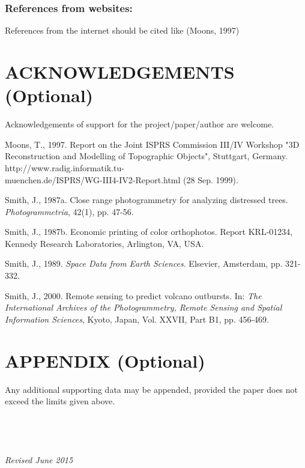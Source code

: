 \documentclass{isprs}
\begin{document}
\subsubsection{References from websites:}
References from the internet should be cited like (Moons, 1997)

\section*{ACKNOWLEDGEMENTS (Optional)}\label{ACKNOWLEDGEMENTS}

Acknowledgements of support for the project/paper/author are welcome. 

{%
	\begin{spacing}{0.9}%
	\end{spacing}
}
Moons, T., 1997. Report on the Joint ISPRS Commission III/IV Workshop 
"3D Reconstruction and Modelling of Topographic Objects", Stuttgart, Germany.
{http://www.radig.informatik.tu-}\\
{muenchen.de/ISPRS/WG-III4-IV2-Report.html} (28 Sep. 1999).

Smith, J., 1987a. Close range photogrammetry for analyzing distressed trees. 
\textit{Photogrammetria}, 42(1), pp. 47-56.

Smith, J., 1987b. Economic printing of color orthophotos. Report KRL-01234, Kennedy Research Laboratories, Arlington, VA, USA.

Smith, J., 1989. \textit{Space Data from Earth Sciences}. Elsevier, Amsterdam, pp. 321-332.

Smith, J., 2000. Remote sensing to predict volcano outbursts. 
In: \textit{The International Archives of the Photogrammetry, Remote 
Sensing and Spatial Information Sciences}, Kyoto, 
Japan, Vol. XXVII, Part B1, pp. 456-469.



\section*{APPENDIX (Optional)}\label{APPENDIX}

Any additional supporting data may be appended, provided the paper does not exceed the limits given above. 
\\
\\
\\
\\
\\
\textit{Revised June 2015}
\end{document}
